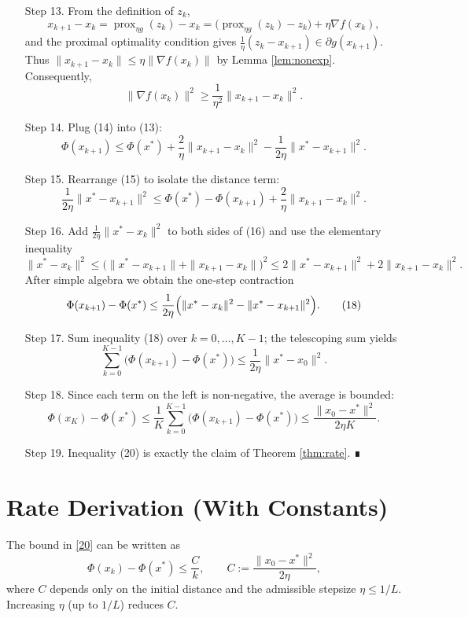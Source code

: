 \documentclass{article}
\begin{document}
\begin{enumerate}
\item[Step 13.] From the definition of $z_{k}$,
\[
x_{k+1}-x_{k}= \operatorname{prox}_{\eta g}(z_{k})-x_{k}
= \bigl(\operatorname{prox}_{\eta g}(z_{k})-z_{k}\bigr)+\eta\nabla f(x_{k}),
\]
and the proximal optimality condition gives $\frac{1}{\eta}(z_{k}-x_{k+1})\in\partial g(x_{k+1})$.
Thus $\|x_{k+1}-x_{k}\|\le \eta\|\nabla f(x_{k})\|$ by Lemma \ref{lem:nonexp}.
Consequently,
\[
\|\nabla f(x_{k})\|^{2}\ge \frac{1}{\eta^{2}}\|x_{k+1}-x_{k}\|^{2}.
\tag{14}
\]

\item[Step 14.] Plug (14) into (13):
\[
\Phi(x_{k+1})\le \Phi(x^{*})+\frac{2}{\eta}\|x_{k+1}-x_{k}\|^{2}
-\frac{1}{2\eta}\|x^{*}-x_{k+1}\|^{2}.
\tag{15}
\]

\item[Step 15.] Rearrange (15) to isolate the distance term:
\[
\frac{1}{2\eta}\|x^{*}-x_{k+1}\|^{2}
\le \Phi(x^{*})-\Phi(x_{k+1})+\frac{2}{\eta}\|x_{k+1}-x_{k}\|^{2}.
\tag{16}
\]

\item[Step 16.] Add $\frac{1}{2\eta}\|x^{*}-x_{k}\|^{2}$ to both sides of (16) and use the elementary inequality
\[
\|x^{*}-x_{k}\|^{2}\le \bigl(\|x^{*}-x_{k+1}\|+\|x_{k+1}-x_{k}\|\bigr)^{2}
\le 2\|x^{*}-x_{k+1}\|^{2}+2\|x_{k+1}-x_{k}\|^{2}.
\tag{17}
\]
After simple algebra we obtain the one‑step contraction
\[
\Phi(x_{k+1})-\Phi(x^{*})\le \frac{1}{2\eta}\Bigl(\|x^{*}-x_{k}\|^{2}-\|x^{*}-x_{k+1}\|^{2}\Bigr).
\tag{18}
\]

\item[Step 17.] Sum inequality (18) over $k=0,\dots, K-1$; the telescoping sum yields
\[
\sum_{k=0}^{K-1}\bigl(\Phi(x_{k+1})-\Phi(x^{*})\bigr)
\le \frac{1}{2\eta}\|x^{*}-x_{0}\|^{2}.
\tag{19}
\]

\item[Step 18.] Since each term on the left is non‑negative, the average is bounded:
\[
\Phi(x_{K})-\Phi(x^{*})\le
\frac{1}{K}\sum_{k=0}^{K-1}\bigl(\Phi(x_{k+1})-\Phi(x^{*})\bigr)
\le \frac{\|x_{0}-x^{*}\|^{2}}{2\eta K}.
\tag{20}
\]

\item[Step 19.] Inequality (20) is exactly the claim of Theorem \ref{thm:rate}. ∎
\end{enumerate}

\section*{Rate Derivation (With Constants)}
The bound in \eqref{20} can be written as
\[
\Phi(x_{k})-\Phi(x^{*})\le \frac{C}{k},
\qquad C:=\frac{\|x_{0}-x^{*}\|^{2}}{2\eta},
\]
where $C$ depends only on the initial distance and the admissible stepsize $\eta\le1/L$. Increasing $\eta$ (up to $1/L$) reduces $C$.
\end{document}
